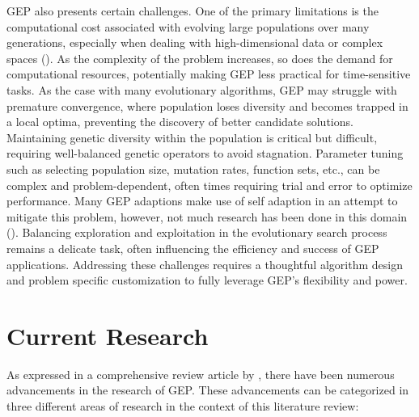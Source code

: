 \parbreak\noindent GEP also presents certain challenges. One of the primary limitations is the computational cost associated with evolving large populations over many generations, especially when dealing with high-dimensional data or complex spaces (\cite{zhong2017gene}). As the complexity of the problem increases, so does the demand for computational resources, potentially making GEP less practical for time-sensitive tasks. As the case with many evolutionary algorithms, GEP may struggle with premature convergence, where population loses diversity and becomes trapped in a local optima, preventing the discovery of better candidate solutions. Maintaining genetic diversity within the population is critical but difficult, requiring well-balanced genetic operators to avoid stagnation. Parameter tuning such as selecting population size, mutation rates, function sets, etc., can be complex and problem-dependent, often times requiring trial and error to optimize performance. Many GEP adaptions make use of self adaption in an attempt to mitigate this problem, however, not much research has been done in this domain (\cite{zhong2017gene}). Balancing exploration and exploitation in the evolutionary search process remains a delicate task, often influencing the efficiency and success of GEP applications. Addressing these challenges requires a thoughtful algorithm design and problem specific customization to fully leverage GEP's flexibility and power.

\section{Current Research}\label{sec:gep_current_research}
As expressed in a comprehensive review article by \cite{zhong2017gene}, there have been numerous advancements in the research of GEP. These advancements can be categorized in three different areas of research in the context of this literature review:

